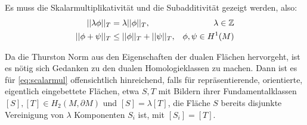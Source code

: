           Es muss die Skalarmultiplikativität und die Subadditivität gezeigt werden, also:
            \begin{align}
                ||\lambda\phi||_T & = \lambda ||\phi||_T ,&\lambda \in\mathbb{Z} \label{eq:scalarmul} \\
                ||\phi + \psi||_T &\leq ||\phi||_T + ||\psi||_T ,& \phi,\psi \in H^1(M) \label{eq:subadd}
            \end{align} 

            Da die Thurston Norm aus den Eigenschaften der dualen Flächen hervorgeht, ist es nötig sich Gedanken zu den dualen Homologieklassen zu machen. Dann ist es für \eqref{eq:scalarmul} offensichtlich hinreichend, falls für repräsentierende, orientierte, eigentlich eingebettete Flächen, etwa $S,T$ mit Bildern ihrer Fundamentalklassen $[S],[T]\in H_2(M,\partial M)$ und $[S]=\lambda [T]$, die Fläche $S$ bereits disjunkte Vereinigung von $\lambda$ Komponenten $S_i$ ist, mit $[S_i]=[T]$. 

